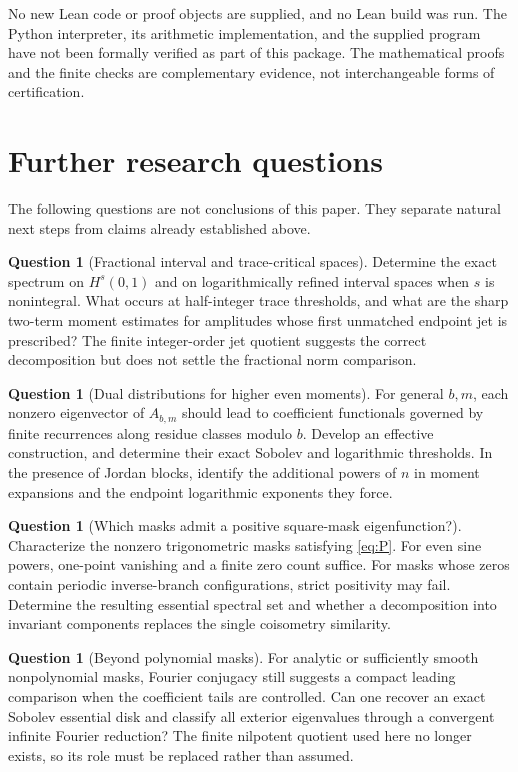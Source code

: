 \documentclass[11pt,a4paper]{article}
\theoremstyle{definition}
\newtheorem{question}[theorem]{Question}
\theoremstyle{remark}
\numberwithin{equation}{section}
\begin{document}
No new Lean code or proof objects are supplied, and no Lean build was run.
The Python interpreter, its arithmetic implementation, and the supplied
program have not been formally verified as part of this package. The
mathematical proofs and the finite checks are complementary evidence,
not interchangeable forms of certification.

\section{Further research questions}
\label{sec:questions}
The following questions are not conclusions of this paper. They separate
natural next steps from claims already established above.

\begin{question}[Fractional interval and trace-critical spaces]
Determine the exact spectrum on $H^s(0,1)$ and on logarithmically refined
interval spaces when $s$ is nonintegral. What occurs at half-integer trace
thresholds, and what are the sharp two-term moment estimates for amplitudes
whose first unmatched endpoint jet is prescribed? The finite integer-order
jet quotient suggests the correct decomposition but does not settle the
fractional norm comparison.
\end{question}

\begin{question}[Dual distributions for higher even moments]
For general $b,m$, each nonzero eigenvector of $A_{b,m}$ should lead to
coefficient functionals governed by finite recurrences along residue
classes modulo $b$. Develop an effective construction, and determine their
exact Sobolev and logarithmic thresholds. In the presence of Jordan blocks,
identify the additional powers of $n$ in moment expansions and the endpoint
logarithmic exponents they force.
\end{question}

\begin{question}[Which masks admit a positive square-mask eigenfunction?]
Characterize the nonzero trigonometric masks satisfying \eqref{eq:P}.
For even sine powers, one-point vanishing and a finite zero count suffice.
For masks whose zeros contain periodic inverse-branch configurations,
strict positivity may fail. Determine the resulting essential spectral set
and whether a decomposition into invariant components replaces the single
coisometry similarity.
\end{question}

\begin{question}[Beyond polynomial masks]
For analytic or sufficiently smooth nonpolynomial masks, Fourier conjugacy
still suggests a compact leading comparison when the coefficient tails are
controlled. Can one recover an exact Sobolev essential disk and classify
all exterior eigenvalues through a convergent infinite Fourier reduction?
The finite nilpotent quotient used here no longer exists, so its role must
be replaced rather than assumed.
\end{question}
\end{document}
